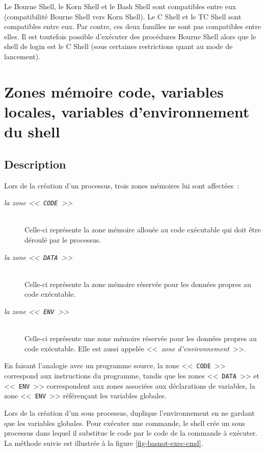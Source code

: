 Le Bourne Shell, le Korn Shell et le Bash Shell sont compatibles entre
eux (compatibilit{\'e} Bourne Shell vers Korn Shell). Le C Shell et le TC
Shell sont compatibles entre eux. Par contre, ces deux familles ne sont
pas compatibles entre elles. Il est toutefois possible d'ex{\'e}cuter des
proc{\'e}dures Bourne Shell alors que le shell de login est le C Shell (sous
certaines restrictions quant au mode de lancement).

\section{\label{basicn-codevar}Zones m{\'e}moire code, variables locales, variables d'environnement du shell}

\subsection{Description}

Lors de la cr{\'e}ation d'un processus, trois zones
m{\'e}moires lui sont affect{\'e}es~:
\begin{description}
	\item[\textsl{la zone <<~\texttt{CODE}~>>}]\mbox{}\\
		Celle-ci repr{\'e}sente la zone m{\'e}moire allou{\'e}e au code ex{\'e}cutable qui
		doit {\^e}tre d{\'e}roul{\'e} par le processus.
	\item[\textsl{la zone <<~\texttt{DATA}~>>}]\mbox{}\\
		Celle-ci repr{\'e}sente la zone m{\'e}moire r{\'e}serv{\'e}e pour les donn{\'e}es propres
		au code ex{\'e}cutable.
	\item[\textsl{la zone <<~\texttt{ENV}~>>}]\mbox{}\\
		Celle-ci repr{\'e}sente une zone m{\'e}moire r{\'e}serv{\'e}e pour les donn{\'e}es propres
		au code ex{\'e}cutable. Elle est aussi appel{\'e}e
		<<~\textsl{zone d'environnement}~>>.
\end{description}
En faisant l'analogie avec un programme source, la zone <<~\texttt{CODE}~>>
correspond aux instructions du programme, tandis que les zones
<<~\texttt{DATA}~>> et <<~\texttt{ENV}~>> correspondent aux zones associ{\'e}es
aux d{\'e}clarations de variables, la zone <<~\texttt{ENV}~>> r{\'e}f{\'e}ren\c{c}ant
les variables globales.

Lors de la cr{\'e}ation d'un sous processus, {\Unix} duplique l'environnement en
ne gardant que les variables globales.
Pour ex{\'e}cuter une commande, le shell cr{\'e}e un sous processus dans lequel
il substitue le code par le code de la commande {\`a} ex{\'e}cuter. La m{\'e}thode suivie est
illustr{\'e}e {\`a} la figure \ref{fig-basnot-exec-cmd}.

